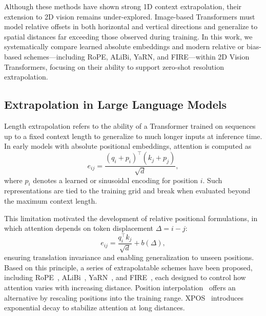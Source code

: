 Although these methods have shown strong 1D context extrapolation, their extension to 2D vision remains under-explored. Image-based Transformers must model relative offsets in both horizontal and vertical directions and generalize to spatial distances far exceeding those observed during training. In this work, we systematically compare learned absolute embeddings and modern relative or bias-based schemes—including RoPE, ALiBi, YaRN, and FIRE—within 2D Vision Transformers, focusing on their ability to support zero-shot resolution extrapolation.





\subsection{Extrapolation in Large Language Models}




Length extrapolation refers to the ability of a Transformer trained on sequences up to a fixed context length to generalize to much longer inputs at inference time. In early models with absolute positional embeddings, attention is computed as
\begin{equation}
e_{ij} = \frac{(q_i + p_i)^\top (k_j + p_j)}{\sqrt{d}},
\end{equation}
where $p_i$ denotes a learned or sinusoidal encoding for position $i$. Such representations are tied to the training grid and break when evaluated beyond the maximum context length.

This limitation motivated the development of relative positional formulations, in which attention depends on token displacement $\Delta=i-j$:
\begin{equation}
e_{ij} = \frac{q_i^\top k_j}{\sqrt{d}} + b(\Delta),
\end{equation}
ensuring translation invariance and enabling generalization to unseen positions. Based on this principle, a series of extrapolatable schemes have been proposed, including RoPE~\cite{su2024roformer}, ALiBi~\cite{press2022train}, YaRN~\cite{peng2024yarn}, and FIRE~\cite{li2024functional}, each designed to control how attention varies with increasing distance. Position interpolation~\cite{chen2024extending} offers an alternative by rescaling positions into the training range. XPOS~\cite{sun2022length} introduces exponential decay to stabilize attention at long distances.

